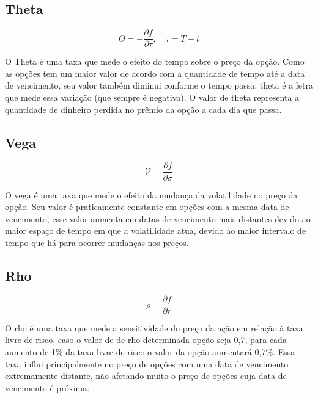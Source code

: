 \documentclass[]{book}
\theoremstyle{definition}
\theoremstyle{definition}
\theoremstyle{definition}
\theoremstyle{remark}
\begin{document}
\hypertarget{theta}{%
\subsection{Theta}\label{theta}}

\begin{equation}
\Theta = -\frac{\partial f}{\partial \tau}, \quad \tau=T-t
\label{eq:theta}
\end{equation}

O Theta é uma taxa que mede o efeito do tempo sobre o preço da opção. Como as opções tem um maior valor de acordo com a quantidade de tempo até a data de vencimento, seu valor também diminui conforme o tempo passa, theta é a letra que mede essa variação (que sempre é negativa). O valor de theta representa a quantidade de dinheiro perdida no prêmio da opção a cada dia que passa.

\hypertarget{vega}{%
\subsection{Vega}\label{vega}}

\begin{equation}
\displaystyle {\mathcal {V}}=\frac{\partial f}{\partial \sigma} 
\label{eq:vega}
\end{equation}

O vega é uma taxa que mede o efeito da mudança da volatilidade no preço da opção. Seu valor é praticamente constante em opções com a mesma data de vencimento, esse valor aumenta em datas de vencimento mais distantes devido ao maior espaço de tempo em que a volatilidade atua, devido ao maior intervalo de tempo que há para ocorrer mudanças nos preços.

\hypertarget{rho}{%
\subsection{Rho}\label{rho}}

\begin{equation}
\displaystyle \rho =\frac{\partial f}{\partial r}
\label{eq:rho}
\end{equation}

O rho é uma taxa que mede a sensitividade do preço da ação em relação à taxa livre de risco, caso o valor de de rho determinada opção seja 0,7, para cada aumento de 1\% da taxa livre de risco o valor da opção aumentará 0,7\%. Essa taxa influi principalmente no preço de opções com uma data de vencimento extremamente distante, não afetando muito o preço de opções cuja data de vencimento é próxima.
\end{document}
